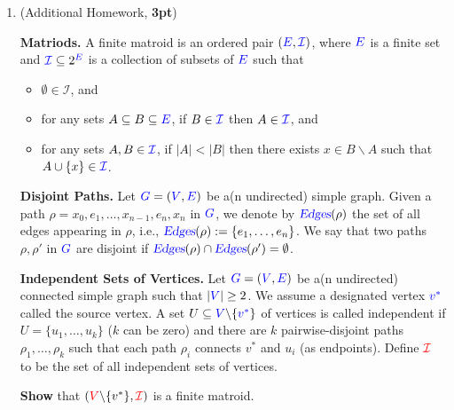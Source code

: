 \documentclass[12pt,a4paper]{article}
\theoremstyle{definition}
\begin{document}
\begin{enumerate}
\item (Additional Homework, \textbf{3pt})  

{\bf Matriods.} A finite {\color{red} matroid} is an ordered pair $({\color{blue} E}, {\color{blue} \mathcal{I}})$, where $\color{blue} E$ is a finite set and ${\color{blue} \mathcal{I}}\subseteq 2^{\color{blue} E}$ is a collection of subsets of $\color{blue} E$ such that 
\begin{itemize}
\item $\emptyset\in \mathcal{I}$, and 
\item for any sets $A\subseteq B\subseteq {\color{blue} E}$, if $B\in {\color{blue} \mathcal{I}}$ then $A\in {\color{blue} \mathcal{I}}$, and 
\item for any sets $A, B\in {\color{blue} \mathcal{I}}$, if $|A|<|B|$ then there exists $x\in B\backslash A$ such that $A\cup \{x\}\in {\color{blue} \mathcal{I}}$.   
\end{itemize}

{\bf Disjoint Paths.}
Let ${\color{blue} G}=({\color{blue} V}, {\color{blue} E})$ be a(n undirected) simple graph.
Given a path $\rho=x_0, e_1, \dots, x_{n-1}, e_{n}, x_n$ in $\color{blue} G$, we denote by $\mbox{\sl \color{blue} Edges}(\rho)$ the set of all edges appearing in $\rho$, i.e., 
${\mbox{\sl \color{blue} Edges}}(\rho):=\{e_1, \dots, e_n\}$. 
We say that two paths $\rho, \rho'$ in $\color{blue} G$ are {\color{red} disjoint} if $\mbox{\sl \color{blue} Edges}(\rho)\cap \mbox{\sl \color{blue} Edges}(\rho')=\emptyset$. 

{\bf Independent Sets of Vertices.}
Let ${\color{blue} G}=({\color{blue} V}, {\color{blue} E})$ be a(n undirected) connected simple graph such that $|{\color{blue} V}|\ge 2$.
We assume a designated vertex $\color{blue} v^*$ called the {\color{orange} source} vertex.    
A set $U\subseteq {\color{blue} V}\backslash\{{\color{blue} v^*}\}$ of vertices is called {\color{red} independent} if $U=\{u_1, \dots, u_k\}$ ($k$ can be zero) and there are $k$ pairwise-disjoint paths $\rho_1, \dots, \rho_k$ 
such that each path $\rho_i$ connects $v^*$ and $u_i$ (as endpoints).
Define $\color{red} \mathcal{I}$ to be the set of all independent sets of vertices.  

\textbf{Show} that $({\color{red} V}\backslash\{v^*\}, {\color{red} \mathcal{I}})$ is a finite matroid. 


\end{enumerate}
\end{document}
